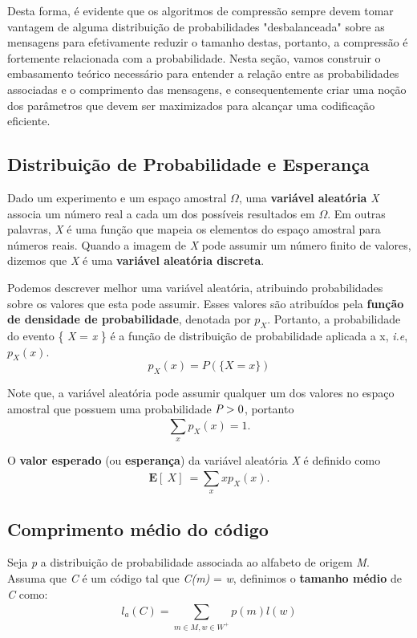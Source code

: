 Desta forma, é evidente que os algoritmos de compressão sempre devem tomar vantagem de alguma distribuição de probabilidades "desbalanceada" sobre as mensagens para efetivamente reduzir o tamanho destas, portanto, a compressão é fortemente relacionada com a probabilidade. Nesta seção, vamos construir o embasamento teórico necessário para entender a relação entre as probabilidades associadas e o comprimento das mensagens, e consequentemente criar uma noção dos parâmetros que devem ser maximizados para alcançar uma codificação eficiente.

\subsection{Distribuição de Probabilidade e Esperança}
Dado um experimento e um espaço amostral $\Omega$, uma \textbf{variável aleatória} \emph{X} associa um número real a cada um dos possíveis resultados em $\Omega$. Em outras palavras, \emph{X} é uma função que mapeia os elementos do espaço amostral para números reais. Quando a imagem de \emph{X} pode assumir um número finito de valores, dizemos que \emph{X} é uma \textbf{variável aleatória discreta}.

Podemos descrever melhor uma variável aleatória, atribuindo probabilidades sobre os valores que esta pode assumir. Esses valores são atribuídos pela \textbf{função de densidade de probabilidade}, denotada por \emph{$p_X$}. Portanto, a probabilidade do evento \{ \emph{X} = \emph{x} \} é a função de distribuição de probabilidade aplicada a x, \emph{i.e}, \emph{$p_X(x)$}.
\begin{equation}
p_X(x) = P(\{X = x\})
\end{equation}

Note que, a variável aleatória pode assumir qualquer um dos valores no espaço amostral que possuem uma probabilidade $\emph{P} > 0$, portanto
\begin{equation}
\sum_{x}^{}p_X(x) = 1.
\end{equation}

O \textbf{valor esperado} (ou \textbf{esperança}) da variável aleatória \emph{X} é definido como
\begin{equation}
\textbf{E}[\ X]\ = \sum_{x}^{} xp_X(x).
\end{equation}

\subsection{Comprimento médio do código}
Seja \emph{p} a distribuição de probabilidade associada ao alfabeto de origem \emph{M}. Assuma que \emph{C} é um código tal que \emph{C(m)} = \emph{w}, definimos o \textbf{tamanho médio} de \emph{C} como:
\begin{equation}
l_a (C) = \sum_{m \in M, w \in W^+}^{} p(m) l(w)
\end{equation}

